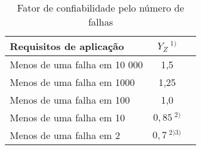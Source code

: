 \begin{table}[]
\centering
\caption{\label{tab:x} Fator de confiabilidade pelo número de falhas}
\begin{tabular}{ l c c}
\hline
\textbf{Requisitos de aplicação}        &\textbf{$Y_Z \ ^{1)}$} \\ \hline
Menos de uma falha em 10 000            & 1,5       \\
Menos de uma falha em 1000              & 1,25      \\
Menos de uma falha em 100               & 1,0       \\
Menos de uma falha em 10                & $0,85\ ^{2)}$   \\
Menos de uma falha em 2                 & $0,7\ ^{2) 3)}$
\end{tabular}
\end{table}